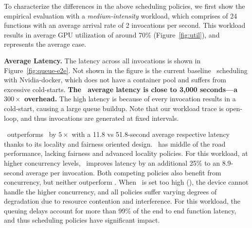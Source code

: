 To characterize the differences in the above scheduling policies, we first show the empirical evaluation with a \emph{medium-intensity} workload, which comprises of 24 functions with an average arrival rate of 2 invocations per second. 
This workload results in average GPU utilization of around 70\% (Figure~\ref{fig:util}), and represents the average case. 

\noindent \textbf{Average Latency.}
The latency across all invocations is shown in Figure~\ref{fig:queue-e2e}.
Not shown in the figure is the current baseline \naive~scheduling with Nvidia-docker, which does not have a container pool and suffers from excessive cold-starts.
\textbf{The \naive~average latency is close to 3,000 seconds---a $300\times$ overhead.}
The high latency is because of every invocation results in a cold-start, causing a large queue buildup.
Note that our workload trace is open-loop, and thus invocations are generated at fixed intervals.


\QName~outperforms \fcfs~by $5\times$ with a 11.8 vs 51.8-second average respective latency thanks to its locality and fairness oriented design.
\batch~has middle of the road performance, lacking fairness and advanced locality policies.
For this workload, at higher concurrency levels, \QName~improves latency by an additional 25\% to an 8.9-second average per invocation.
Both competing policies also benefit from concurrency, but neither outperform \QName.
When \D~is set too high (), the device cannot handle the higher concurrency, and all policies suffer varying degrees of degradation due to resource contention and interference.
For this workload, the queuing delays account for more than 99\% of the end to end function latency, and thus scheduling policies have significant impact. 


